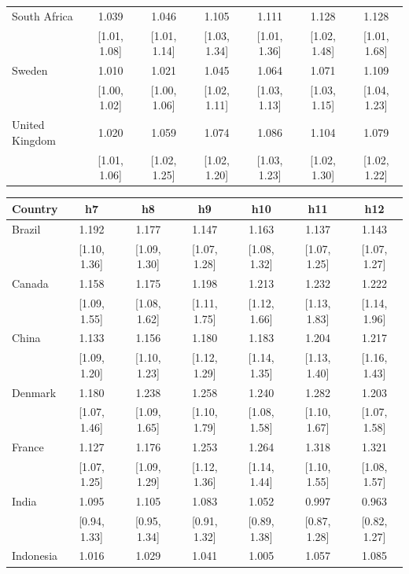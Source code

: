 \begin{table}[htbp]
{\begin{tabular*}{\textwidth}{@{\extracolsep{\fill}}lcccccc}
\addlinespace
South Africa & 1.039 & 1.046 & 1.105 & 1.111 & 1.128 & 1.128 \\
 & [1.01, 1.08] & [1.01, 1.14] & [1.03, 1.34] & [1.01, 1.36] & [1.02, 1.48] & [1.01, 1.68] \\
\addlinespace
Sweden & 1.010 & 1.021 & 1.045 & 1.064 & 1.071 & 1.109 \\
 & [1.00, 1.02] & [1.00, 1.06] & [1.02, 1.11] & [1.03, 1.13] & [1.03, 1.15] & [1.04, 1.23] \\
\addlinespace
United Kingdom & 1.020 & 1.059 & 1.074 & 1.086 & 1.104 & 1.079 \\
 & [1.01, 1.06] & [1.02, 1.25] & [1.02, 1.20] & [1.03, 1.23] & [1.02, 1.30] & [1.02, 1.22] \\
\bottomrule
\end{tabular*}

\vspace{6pt}
\begin{tabular*}{\textwidth}{@{\extracolsep{\fill}}lcccccc}
\toprule
Country & h7 & h8 & h9 & h10 & h11 & h12 \\
\midrule
Brazil & 1.192 & 1.177 & 1.147 & 1.163 & 1.137 & 1.143 \\
 & [1.10, 1.36] & [1.09, 1.30] & [1.07, 1.28] & [1.08, 1.32] & [1.07, 1.25] & [1.07, 1.27] \\
\addlinespace
Canada & 1.158 & 1.175 & 1.198 & 1.213 & 1.232 & 1.222 \\
 & [1.09, 1.55] & [1.08, 1.62] & [1.11, 1.75] & [1.12, 1.66] & [1.13, 1.83] & [1.14, 1.96] \\
\addlinespace
China & 1.133 & 1.156 & 1.180 & 1.183 & 1.204 & 1.217 \\
 & [1.09, 1.20] & [1.10, 1.23] & [1.12, 1.29] & [1.14, 1.35] & [1.13, 1.40] & [1.16, 1.43] \\
\addlinespace
Denmark & 1.180 & 1.238 & 1.258 & 1.240 & 1.282 & 1.203 \\
 & [1.07, 1.46] & [1.09, 1.65] & [1.10, 1.79] & [1.08, 1.58] & [1.10, 1.67] & [1.07, 1.58] \\
\addlinespace
France & 1.127 & 1.176 & 1.253 & 1.264 & 1.318 & 1.321 \\
 & [1.07, 1.25] & [1.09, 1.29] & [1.12, 1.36] & [1.14, 1.44] & [1.10, 1.55] & [1.08, 1.57] \\
\addlinespace
India & 1.095 & 1.105 & 1.083 & 1.052 & 0.997 & 0.963 \\
 & [0.94, 1.33] & [0.95, 1.34] & [0.91, 1.32] & [0.89, 1.38] & [0.87, 1.28] & [0.82, 1.27] \\
\addlinespace
Indonesia & 1.016 & 1.029 & 1.041 & 1.005 & 1.057 & 1.085 \\

\end{tabular*}}
\end{table}
